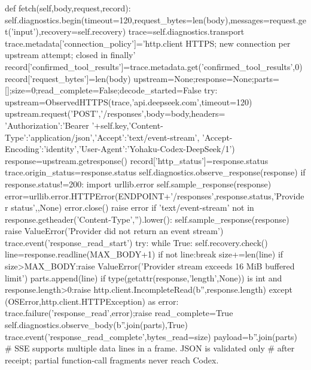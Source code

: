     def fetch(self,body,request,record):
        self.diagnostics.begin(timeout=120,request_bytes=len(body),messages=request.get('input'),recovery=self.recovery)
        trace=self.diagnostics.transport
        trace.metadata['connection_policy']='http.client HTTPS; new connection per upstream attempt; closed in finally'
        record['confirmed_tool_results']=trace.metadata.get('confirmed_tool_results',0)
        record['request_bytes']=len(body)
        upstream=None;response=None;parts=[];size=0;read_complete=False;decode_started=False
        try:
            upstream=ObservedHTTPS(trace,'api.deepseek.com',timeout=120)
            upstream.request('POST','/responses',body=body,headers={
                'Authorization':'Bearer '+self.key,'Content-Type':'application/json','Accept':'text/event-stream',
                'Accept-Encoding':'identity','User-Agent':'Yohaku-Codex-DeepSeek/1'})
            response=upstream.getresponse()
            record['http_status']=response.status
            trace.origin_status=response.status
            self.diagnostics.observe_response(response)
            if response.status!=200:
                import urllib.error
                self.sample_response(response)
                error=urllib.error.HTTPError(ENDPOINT+'/responses',response.status,'Provider status',{},None)
                error.close()
                raise error
            if 'text/event-stream' not in response.getheader('Content-Type','').lower():
                self.sample_response(response)
                raise ValueError('Provider did not return an event stream')
            trace.event('response_read_start')
            try:
                while True:
                    self.recovery.check()
                    line=response.readline(MAX_BODY+1)
                    if not line:break
                    size+=len(line)
                    if size>MAX_BODY:raise ValueError('Provider stream exceeds 16 MiB buffered limit')
                    parts.append(line)
                if type(getattr(response,'length',None)) is int and response.length>0:raise http.client.IncompleteRead(b'',response.length)
            except (OSError,http.client.HTTPException) as error:
                trace.failure('response_read',error);raise
            read_complete=True
            self.diagnostics.observe_body(b''.join(parts),True)
            trace.event('response_read_complete',bytes_read=size)
            payload=b''.join(parts)
            # SSE supports multiple data lines in a frame. JSON is validated only
            # after receipt; partial function-call fragments never reach Codex.
